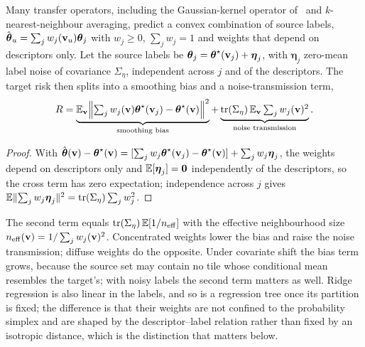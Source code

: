 Many transfer operators, including the Gaussian-kernel operator
of~\cite{ozyurt2026} and $k$-nearest-neighbour averaging, predict a convex
combination of source labels, $\hat{\boldsymbol{\theta}}_u=\sum_j w_j(\mathbf{v}_u)\boldsymbol{\theta}_j$ with
$w_j\ge0$, $\sum_j w_j=1$ and weights that depend on descriptors only. Let
the source labels be $\boldsymbol{\theta}_j=\boldsymbol{\theta}^{\star}(\mathbf{v}_j)+\boldsymbol\eta_j$,
with $\boldsymbol\eta_j$ zero-mean label noise of covariance $\Sigma_\eta$,
independent across $j$ and of the descriptors. The target risk then splits
into a smoothing bias and a noise-transmission term,
\begin{equation}
R=\underbrace{\mathbb{E}_{\mathbf{v}}\Bigl\lVert\textstyle\sum_j w_j(\mathbf{v})\boldsymbol{\theta}^{\star}(\mathbf{v}_j)-\boldsymbol{\theta}^{\star}(\mathbf{v})\Bigr\rVert^{2}}_{\text{smoothing bias}}
+\underbrace{\operatorname{tr}(\Sigma_\eta)\,\mathbb{E}_{\mathbf{v}}\textstyle\sum_j w_j(\mathbf{v})^{2}}_{\text{noise transmission}} .
\label{eq:decomp}
\end{equation}
\begin{proof}
With $\hat{\boldsymbol{\theta}}(\mathbf{v})-\boldsymbol{\theta}^{\star}(\mathbf{v})=[\sum_j w_j\boldsymbol{\theta}^{\star}(\mathbf{v}_j)-\boldsymbol{\theta}^{\star}(\mathbf{v})]+\sum_j w_j\boldsymbol\eta_j$,
the weights depend on descriptors only and $\mathbb{E}[\boldsymbol\eta_j]=\mathbf0$
independently of the descriptors, so the cross term has zero expectation;
independence across $j$ gives
$\mathbb{E}\lVert\sum_j w_j\boldsymbol\eta_j\rVert^{2}=\operatorname{tr}(\Sigma_\eta)\sum_j w_j^{2}$.
\end{proof}
\noindent The second term equals $\operatorname{tr}(\Sigma_\eta)\,\mathbb{E}[1/n_{\mathrm{eff}}]$
with the effective neighbourhood size
$n_{\mathrm{eff}}(\mathbf{v})=1/\sum_j w_j(\mathbf{v})^2$. Concentrated weights lower the
bias and raise the noise transmission; diffuse weights do the opposite.
Under covariate shift the bias term grows, because the source set may
contain no tile whose conditional mean resembles the target's; with noisy
labels the second term matters as well. Ridge regression is also linear in
the labels, and so is a regression tree once its partition is fixed; the
difference is that their weights are not confined to the probability
simplex and are shaped by the descriptor--label relation rather than fixed
by an isotropic distance, which is the distinction that matters below.
